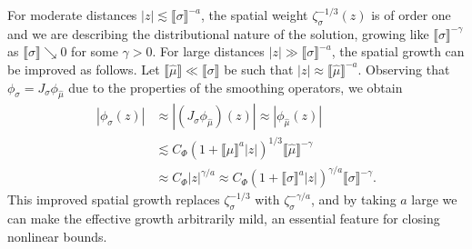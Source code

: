 \documentclass{article}
\numberwithin{equation}{section}
\theoremstyle{plain}
\theoremstyle{definition}
\begin{document}
For moderate distances $| z | \lesssim \llbracket \sigma \rrbracket^{- a}$,
the spatial weight $\zeta_{\sigma}^{- 1 / 3} (z)$ is of order one and we are
describing the distributional nature of the solution, growing like $\llbracket
\sigma \rrbracket^{- \gamma}$ as $\llbracket \sigma \rrbracket \searrow 0$ for
some $\gamma > 0$. For large distances $| z | \gg \llbracket \sigma
\rrbracket^{- a}$, the spatial growth can be improved as follows. Let
$\llbracket\hat{\mu} \rrbracket \ll \llbracket
\sigma \rrbracket$ be such that $| z | \approx \llbracket \hat{\mu}
\rrbracket^{- a}$. Observing that $\phi_{\sigma} = J_{\sigma}
\phi_{\hat{\mu}}$ due to the properties of the smoothing operators, we obtain
\begin{equation}
  \begin{aligned}
    | \phi_{\sigma} (z) | & \approx | (J_{\sigma} \phi_{\hat{\mu}})  (z) |
    \approx | \phi_{\hat{\mu}} (z) |\\
    & \lesssim C_{\Phi}  (1 + \llbracket \hat{\mu} \rrbracket^a | z |)^{1 /
    3}  \llbracket \hat{\mu} \rrbracket^{- \gamma}\\
    & \approx C_{\Phi}  | z |^{\gamma / a} \approx C_{\Phi}  (1 + \llbracket
    \sigma \rrbracket^a | z |)^{\gamma / a}  \llbracket \sigma \rrbracket^{-
    \gamma} .
  \end{aligned} \label{eq:model-better}
\end{equation}
This improved spatial growth replaces $\zeta_{\sigma}^{- 1 / 3}$ with
$\zeta_{\sigma}^{- \gamma / a}$, and by taking $a$ large we can make the
effective growth arbitrarily mild, an essential feature for closing nonlinear
bounds.
\end{document}

